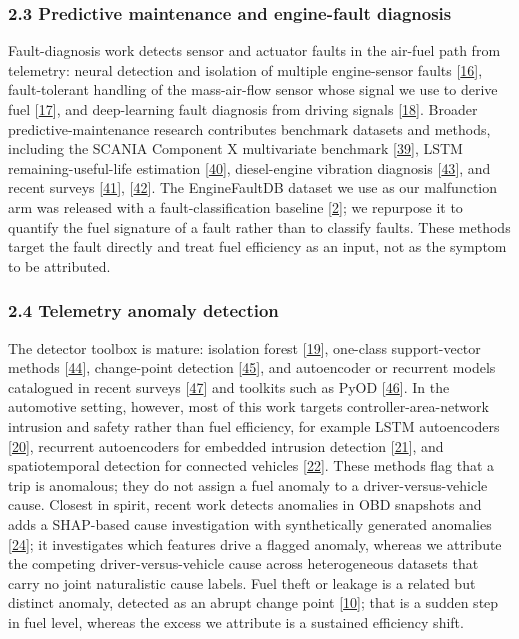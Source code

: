 \subsubsection{2.3 Predictive maintenance and engine-fault
diagnosis}\label{predictive-maintenance-and-engine-fault-diagnosis}

Fault-diagnosis work detects sensor and actuator faults in the air-fuel
path from telemetry: neural detection and isolation of multiple
engine-sensor faults {[}\hyperref[r16]{16}{]}, fault-tolerant handling
of the mass-air-flow sensor whose signal we use to derive fuel
{[}\hyperref[r17]{17}{]}, and deep-learning fault diagnosis from driving
signals {[}\hyperref[r18]{18}{]}. Broader predictive-maintenance
research contributes benchmark datasets and methods, including the
SCANIA Component X multivariate benchmark {[}\hyperref[r39]{39}{]}, LSTM
remaining-useful-life estimation {[}\hyperref[r40]{40}{]}, diesel-engine
vibration diagnosis {[}\hyperref[r43]{43}{]}, and recent surveys
{[}\hyperref[r41]{41}{]}, {[}\hyperref[r42]{42}{]}. The EngineFaultDB
dataset we use as our malfunction arm was released with a
fault-classification baseline {[}\hyperref[r2]{2}{]}; we repurpose it to
quantify the fuel signature of a fault rather than to classify faults.
These methods target the fault directly and treat fuel efficiency as an
input, not as the symptom to be attributed.

\subsubsection{2.4 Telemetry anomaly
detection}\label{telemetry-anomaly-detection}

The detector toolbox is mature: isolation forest
{[}\hyperref[r19]{19}{]}, one-class support-vector methods
{[}\hyperref[r44]{44}{]}, change-point detection
{[}\hyperref[r45]{45}{]}, and autoencoder or recurrent models catalogued
in recent surveys {[}\hyperref[r47]{47}{]} and toolkits such as PyOD
{[}\hyperref[r46]{46}{]}. In the automotive setting, however, most of
this work targets controller-area-network intrusion and safety rather
than fuel efficiency, for example LSTM autoencoders
{[}\hyperref[r20]{20}{]}, recurrent autoencoders for embedded intrusion
detection {[}\hyperref[r21]{21}{]}, and spatiotemporal detection for
connected vehicles {[}\hyperref[r22]{22}{]}. These methods flag that a
trip is anomalous; they do not assign a fuel anomaly to a
driver-versus-vehicle cause. Closest in spirit, recent work detects
anomalies in OBD snapshots and adds a SHAP-based cause investigation
with synthetically generated anomalies {[}\hyperref[r24]{24}{]}; it
investigates which features drive a flagged anomaly, whereas we
attribute the competing driver-versus-vehicle cause across heterogeneous
datasets that carry no joint naturalistic cause labels. Fuel theft or
leakage is a related but distinct anomaly, detected as an abrupt change
point {[}\hyperref[r10]{10}{]}; that is a sudden step in fuel level,
whereas the excess we attribute is a sustained efficiency shift.

